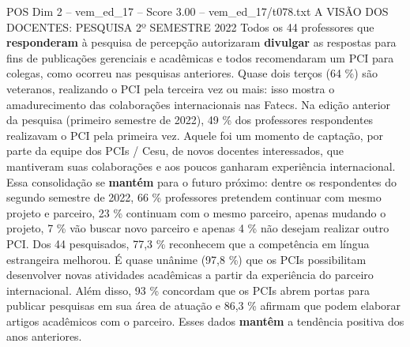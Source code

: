 \begin{textsample}{POS Dim 2 – vem\_ed\_17 – Score 3.00 – vem\_ed\_17/t078.txt}  \label{ex:f2_pos_125}
A VISÃO DOS DOCENTES: PESQUISA 2º SEMESTRE 2022 Todos os 44 professores que \textbf{responderam} à pesquisa de percepção autorizaram \textbf{divulgar} as respostas para fins de publicações gerenciais e acadêmicas e todos recomendaram um PCI para colegas, como ocorreu nas pesquisas anteriores.
Quase dois terços (64 \%) são veteranos, realizando o PCI pela terceira vez ou mais: isso mostra o amadurecimento das colaborações internacionais nas Fatecs.
Na edição anterior da pesquisa (primeiro semestre de 2022), 49 \% dos professores respondentes realizavam o PCI pela primeira vez.
Aquele foi um momento de captação, por parte da equipe dos PCIs / Cesu, de novos docentes interessados, que mantiveram suas colaborações e aos poucos ganharam experiência internacional.
Essa consolidação se \textbf{mantém} para o futuro próximo: dentre os respondentes do segundo semestre de 2022, 66 \% professores pretendem continuar com mesmo projeto e parceiro, 23 \% continuam com o mesmo parceiro, apenas mudando o projeto, 7 \% vão buscar novo parceiro e apenas 4 \% não desejam realizar outro PCI.
Dos 44 pesquisados, 77,3 \% reconhecem que a competência em língua estrangeira melhorou.
É quase unânime (97,8 \%) que os PCIs possibilitam desenvolver novas atividades acadêmicas a partir da experiência do parceiro internacional.
Além disso, 93 \% concordam que os PCIs abrem portas para publicar pesquisas em sua área de atuação e 86,3 \% afirmam que podem elaborar artigos acadêmicos com o parceiro.
Esses dados \textbf{mantêm} a tendência positiva dos anos anteriores.

\end{textsample}
